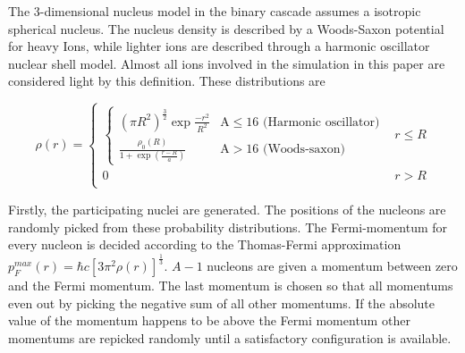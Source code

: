 The 3-dimensional nucleus model in the binary cascade assumes a isotropic spherical nucleus. The nucleus density is described by a Woods-Saxon potential for heavy Ions, while lighter ions are described through a harmonic oscillator nuclear shell model. Almost all ions involved in the simulation in this paper are considered light by this definition. These distributions are 

\begin{equation}
\rho(r) = 
\begin{cases}
\begin{cases}
(\pi R^2)^{\frac{3}{2}}\exp{\frac{-r^2}{R^2}} & \text{A} \le 16 \text{  (Harmonic oscillator)}\\
\frac{\rho_{0}(R)}{1+\exp({\frac{r-R}{a}})} & \text{A} > 16 \text{  (Woods-saxon)}
\end{cases} & r \le R \\
0 & r > R \\
\end{cases}
\label{binaryCascadePotential}
\end{equation}

Firstly, the participating nuclei are generated. The positions of the nucleons are randomly picked from these probability distributions. The Fermi-momentum for every nucleon is decided according to the Thomas-Fermi approximation $p^{max}_F(r) = \hbar c [3 \pi^2 \rho(r)]^\frac{1}{3}$. $A-1$ nucleons are given a momentum between zero and the Fermi momentum. The last momentum is chosen so that all momentums even out by picking the negative sum of all other momentums. If the absolute value of the momentum happens to be above the Fermi momentum other momentums are repicked randomly until a satisfactory configuration is available.

